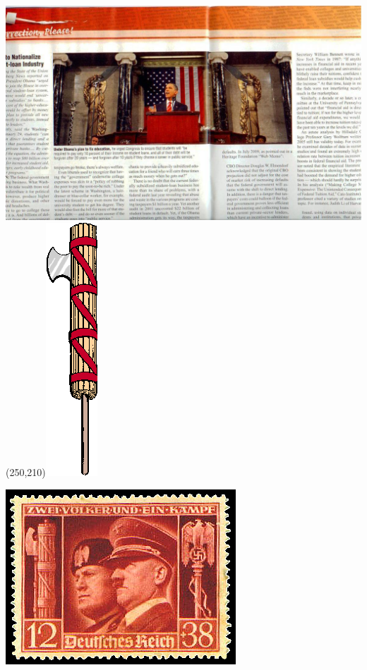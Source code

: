 \begin{frame}
    \centering
    \includegraphics[width=.9\textwidth]{img/obama-fasces.jpg} \\
    \pause
    \Put(250,210){\includegraphics[height=0.55\textwidth]{img/fasces.png}}
\end{frame}

\begin{frame}
    \centering
    \includegraphics[width=.9\textwidth]{img/reich-stamp.png} \\
\end{frame}

